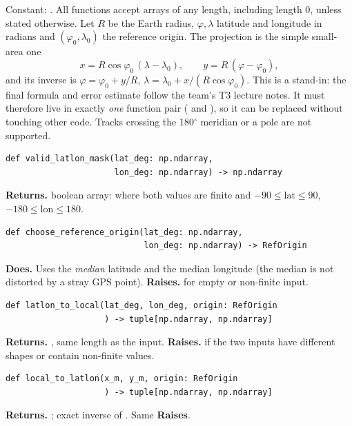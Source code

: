 \documentclass{article}
\newenvironment{card}{\par\smallskip\noindent\begin{minipage}{\linewidth}}{\end{minipage}\par}
\begin{document}
Constant: . All functions accept arrays of
any length, including length 0, unless stated otherwise. Let $R$ be the Earth
radius, $\varphi,\lambda$ latitude and longitude in radians and
$(\varphi_0,\lambda_0)$ the reference origin. The projection is the simple
small-area one
\begin{equation*}
  x = R\cos\varphi_0\,(\lambda-\lambda_0), \qquad y = R\,(\varphi-\varphi_0),
\end{equation*}
and its inverse is $\varphi=\varphi_0+y/R$,
$\lambda=\lambda_0+x/(R\cos\varphi_0)$. This is a stand-in: the final formula
and error estimate follow the team's T3 lecture notes. It must therefore live
in exactly \emph{one} function pair ( and
), so it can be replaced without touching other code.
Tracks crossing the 180$^\circ$ meridian or a pole are not supported.

\begin{card}
\begin{lstlisting}[style=sig]
def valid_latlon_mask(lat_deg: np.ndarray,
                      lon_deg: np.ndarray) -> np.ndarray
\end{lstlisting}
\textbf{Returns.} boolean array:  where both values are finite and
$-90\le\text{lat}\le90$, $-180\le\text{lon}\le180$.
\end{card}

\begin{card}
\begin{lstlisting}[style=sig]
def choose_reference_origin(lat_deg: np.ndarray,
                            lon_deg: np.ndarray) -> RefOrigin
\end{lstlisting}
\textbf{Does.} Uses the \emph{median} latitude and the median longitude (the
median is not distorted by a stray GPS point). \textbf{Raises.}
 for empty or non-finite input.
\end{card}

\begin{card}
\begin{lstlisting}[style=sig]
def latlon_to_local(lat_deg, lon_deg, origin: RefOrigin
                    ) -> tuple[np.ndarray, np.ndarray]
\end{lstlisting}
\textbf{Returns.} , same length as the input.
\textbf{Raises.}  if the two inputs have different
shapes or contain non-finite values.
\end{card}

\begin{card}
\begin{lstlisting}[style=sig]
def local_to_latlon(x_m, y_m, origin: RefOrigin
                    ) -> tuple[np.ndarray, np.ndarray]
\end{lstlisting}
\textbf{Returns.} ; exact inverse of
. Same \textbf{Raises}.
\end{card}
\end{document}
